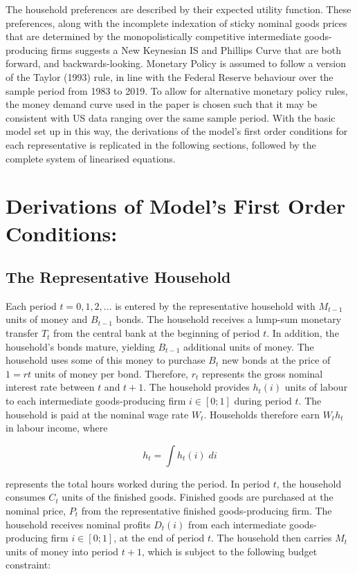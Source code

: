 \documentclass[11pt,preprint, authoryear]{elsarticle}
\numberwithin{equation}{section}
\numberwithin{figure}{section}
\numberwithin{table}{section}
\begin{document}
The household preferences are described by their expected utility
function. These preferences, along with the incomplete indexation of
sticky nominal goods prices that are determined by the monopolistically
competitive intermediate goods-producing firms suggests a New Keynesian
IS and Phillips Curve that are both forward, and backwards-looking.
Monetary Policy is assumed to follow a version of the Taylor (1993)
rule, in line with the Federal Reserve behaviour over the sample period
from 1983 to 2019. To allow for alternative monetary policy rules, the
money demand curve used in the paper is chosen such that it may be
consistent with US data ranging over the same sample period. With the
basic model set up in this way, the derivations of the model's first
order conditions for each representative is replicated in the following
sections, followed by the complete system of linearised equations.

\hypertarget{derivations-of-models-first-order-conditions}{%
\section{Derivations of Model's First Order
Conditions:}\label{derivations-of-models-first-order-conditions}}

\hypertarget{the-representative-household}{%
\subsection{The Representative
Household}\label{the-representative-household}}

Each period \(t=0,1,2,...\) is entered by the representative household
with \(M_{t-1}\) units of money and \(B_{t-1}\) bonds. The household
receives a lump-sum monetary transfer \(T_{t}\) from the central bank at
the beginning of period \(t\). In addition, the household's bonds
mature, yielding \(B_{t-1}\) additional units of money. The household
uses some of this money to purchase \(B_{t}\) new bonds at the price of
\(1=rt\) units of money per bond. Therefore, \(r_t\) represents the
gross nominal interest rate between \(t\) and \(t + 1\). The household
provides \(h_{t}{(i)}\) units of labour to each intermediate
goods-producing firm \(i\in{[0; 1]}\) during period \(t\). The household
is paid at the nominal wage rate \(W_{t}\). Households therefore earn
\(W_{t}h_{t}\) in labour income, where

\[h_{t}=\int h_{t}{(i)} \;di\]

represents the total hours worked during the period. In period \(t\),
the household consumes \(C_{t}\) units of the finished goods. Finished
goods are purchased at the nominal price, \(P_{t}\) from the
representative finished goods-producing firm. The household receives
nominal profits \(D_{t}(i)\) from each intermediate goods-producing firm
\(i \in {[0; 1]}\), at the end of period \(t\). The household then
carries \(M_{t}\) units of money into period \(t + 1\), which is subject
to the following budget constraint:
\end{document}
